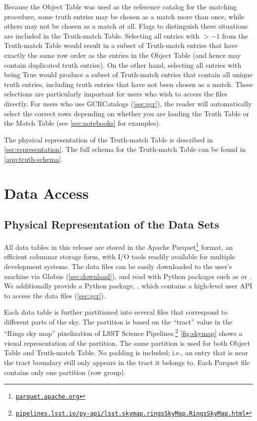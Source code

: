 \documentclass[modern]{descnote}
\newcommand*{\https}[1]{\href{https://#1}{\nolinkurl{#1}}}
\begin{document}
Because the Object Table was used as the reference catalog for the matching procedure, some truth entries may be chosen as a match more than once, while others may not be chosen as a match at all.
Flags to distinguish these situations are included in the Truth-match Table. 
Selecting all entries with  $> -1$ from the Truth-match Table would result in a subset of Truth-match entries that have exactly the same row order as the entries in the Object Table (and hence may contain duplicated truth entries). On the other hand, selecting all entries with  being True would produce a subset of Truth-match entries that contain all unique truth entries, including truth entries that have not been chosen as a match.
These selections are particularly important for users who wish to access the files directly. For users who use GCRCatalogs (\autoref{sec:gcr}), the reader will automatically select the correct rows depending on whether you are loading the Truth Table or the Match Table (see \autoref{sec:notebooks} for examples).

The physical representation of the Truth-match Table is described in \autoref{sec:representation}. The full schema for the Truth-match Table can be found in \autoref{app:truth-schema}.



\section{Data Access}
\label{sec:access}


\subsection{Physical Representation of the Data Sets}
\label{sec:representation}

All data tables in this release are stored in the Apache Parquet\footnote{\https{parquet.apache.org}} format, an efficient columnar storage form, with I/O tools readily available for multiple development systems. 
The data files can be easily downloaded to the user's machine via Globus (\autoref{sec:download}), and read with Python packages such as  or .
We additionally provide a Python package, , which contains a high-level user API to access the data files (\autoref{sec:gcr}). 

Each data table is further partitioned into several files that correspond to different parts of the sky. The partition is based on the ``tract'' value in the ``Rings sky map'' pixelization of LSST Science Pipelines.\footnote{\https{pipelines.lsst.io/py-api/lsst.skymap.ringsSkyMap.RingsSkyMap.html}} \autoref{fig:skymap} shows a visual representation of the partition. The same partition is used for both Object Table and Truth-match Table. No padding is included; i.e., an entry that is near the tract boundary still only appears in the tract it belongs to. Each Parquet file contains only one partition (row group). 
\end{document}
